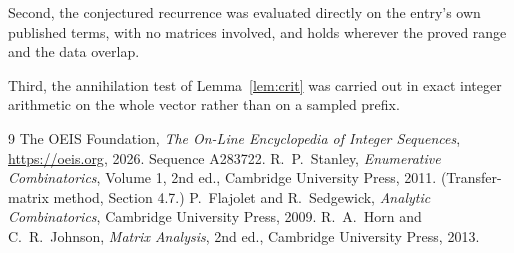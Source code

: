 \documentclass[11pt,a4paper]{article}
\theoremstyle{plain}
\theoremstyle{definition}
\begin{document}
Second, the conjectured recurrence was evaluated directly on the entry's own published terms,
with no matrices involved, and holds wherever the proved range and the data overlap.

Third, the annihilation test of Lemma~\ref{lem:crit} was carried out in exact integer
arithmetic on the whole vector rather than on a sampled prefix.

\begin{thebibliography}{9}
 The OEIS Foundation, \emph{The On-Line Encyclopedia of Integer
Sequences}, \url{https://oeis.org}, 2026. Sequence A283722.
 R.~P.~Stanley, \emph{Enumerative Combinatorics}, Volume 1, 2nd ed.,
Cambridge University Press, 2011. (Transfer-matrix method, Section 4.7.)
 P.~Flajolet and R.~Sedgewick, \emph{Analytic Combinatorics}, Cambridge
University Press, 2009.
 R.~A.~Horn and C.~R.~Johnson, \emph{Matrix Analysis}, 2nd ed., Cambridge
University Press, 2013.
\end{thebibliography}
\end{document}

